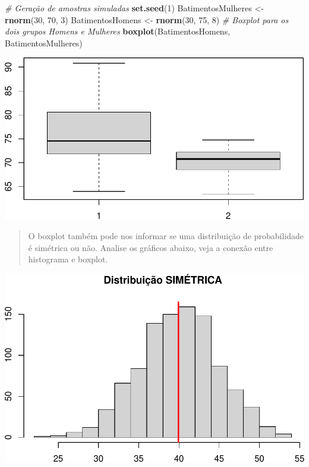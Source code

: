 \documentclass[
]{book}
\newenvironment{Shaded}{\begin{snugshade}}{\end{snugshade}}
\newcommand{\CommentTok}[1]{\textcolor[rgb]{0.56,0.35,0.01}{\textit{#1}}}
\newcommand{\DecValTok}[1]{\textcolor[rgb]{0.00,0.00,0.81}{#1}}
\newcommand{\FunctionTok}[1]{\textcolor[rgb]{0.13,0.29,0.53}{\textbf{#1}}}
\newcommand{\NormalTok}[1]{#1}
\newcommand{\OtherTok}[1]{\textcolor[rgb]{0.56,0.35,0.01}{#1}}
\begin{document}
\begin{Shaded}
\begin{Highlighting}[]
\CommentTok{\# Geração de amostras simuladas}
\FunctionTok{set.seed}\NormalTok{(}\DecValTok{1}\NormalTok{)}
\NormalTok{BatimentosMulheres }\OtherTok{\textless{}{-}} \FunctionTok{rnorm}\NormalTok{(}\DecValTok{30}\NormalTok{, }\DecValTok{70}\NormalTok{, }\DecValTok{3}\NormalTok{)}
\NormalTok{BatimentosHomens }\OtherTok{\textless{}{-}} \FunctionTok{rnorm}\NormalTok{(}\DecValTok{30}\NormalTok{, }\DecValTok{75}\NormalTok{, }\DecValTok{8}\NormalTok{)}
\CommentTok{\# Boxplot para os dois grupos Homens e Mulheres }
\FunctionTok{boxplot}\NormalTok{(BatimentosHomens, BatimentosMulheres)}
\end{Highlighting}
\end{Shaded}

\includegraphics{Livro-Estatistica+R_files/figure-latex/unnamed-chunk-20-1.pdf}

\begin{quote}
O boxplot também pode nos informar se uma distribuição de probabilidade é simétrica ou não. Analise os gráficos abaixo, veja a conexão entre histograma e boxplot.
\end{quote}

\includegraphics{Livro-Estatistica+R_files/figure-latex/unnamed-chunk-21-1.pdf}
\end{document}
